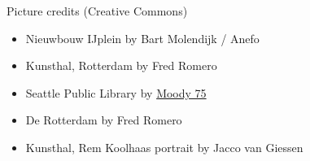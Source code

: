 \documentclass[aspectratio=169,12pt,usepdftitle=false]{beamer} %
\begin{document}
{
\begin{frame}[plain]
\end{frame}
}

\begin{frame}{Picture credits (Creative Commons)}
    \begin{itemize}
	\item Nieuwbouw IJplein by Bart Molendijk / Anefo
	\item Kunsthal, Rotterdam by Fred Romero
	\item Seattle Public Library by \href{https://www.flickr.com/people/moody75/}{Moody 75}
	\item De Rotterdam by Fred Romero
	\item Kunsthal, Rem Koolhaas portrait by Jacco van Giessen
    \end{itemize}
\end{frame}
\end{document}
